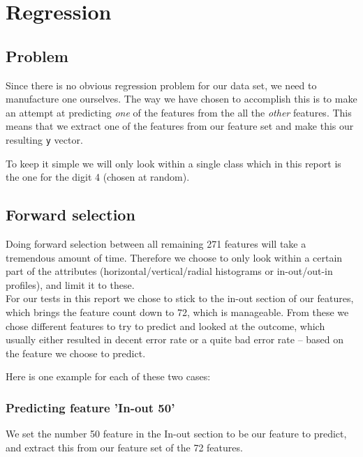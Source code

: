 \chapter{Regression}

\section{Problem}
Since there is no obvious regression problem for our data set, we need to manufacture one ourselves. The way we have chosen to accomplish this is to make an attempt at predicting \emph{one} of the features from the all the \emph{other} features. This means that we extract one of the features from our feature set and make this our resulting \texttt{y} vector.

To keep it simple we will only look within a single class which in this report is the one for the digit 4 (chosen at random).

\section{Forward selection}
Doing forward selection between all remaining 271 features will take a tremendous amount of time. Therefore we choose to only look within a certain part of the attributes (horizontal/vertical/radial histograms or in-out/out-in profiles), and limit it to these. \\

For our tests in this report we chose to stick to the in-out section of our features, which brings the feature count down to 72, which is manageable. From these we chose different features to try to predict and looked at the outcome, which usually either resulted in decent error rate or a quite bad error rate -- based on the feature we choose to predict.

Here is one example for each of these two cases:

\subsection*{Predicting feature 'In-out 50'}

We set the number 50 feature in the In-out section to be our feature to predict, and extract this from our feature set of the 72 features. 

